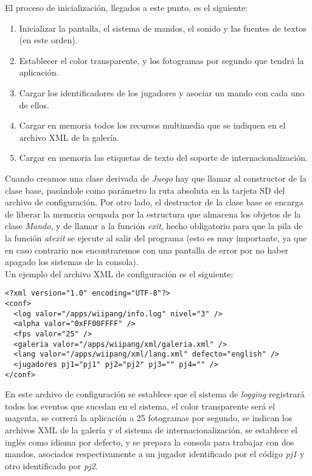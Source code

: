 El proceso de inicialización, llegados a este punto, es el siguiente:

\begin{enumerate}
\item Inicializar la pantalla, el sistema de mandos, el sonido y las fuentes de textos (en este orden).
\item Establecer el color transparente, y los fotogramas por segundo que tendrá la aplicación.
\item Cargar los identificadores de los jugadores y asociar un mando con cada uno de ellos.
\item Cargar en memoria todos los recursos multimedia que se indiquen en el archivo XML de la galería.
\item Cargar en memoria las etiquetas de texto del soporte de internacionalización.
\end{enumerate}

Cuando creamos una clase derivada de \emph{Juego} hay que llamar al constructor de la clase base, pasándole como parámetro la ruta absoluta en la tarjeta SD del archivo de configuración. Por otro lado, el destructor de la clase base se encarga de liberar la memoria ocupada por la estructura que almacena los objetos de la clase \emph{Mando}, y de llamar a la función \emph{exit}, hecho obligatorio para que la pila de la función \emph{atexit} se ejecute al salir del programa (esto es muy importante, ya que en caso contrario nos encontraremos con una pantalla de error por no haber apagado los sistemas de la consola).\\

Un ejemplo del archivo XML de configuración es el siguiente:

\begin{lstlisting}[style=XML]
<?xml version="1.0" encoding="UTF-8"?>
<conf>
  <log valor="/apps/wiipang/info.log" nivel="3" />
  <alpha valor="0xFF00FFFF" />
  <fps valor="25" />
  <galeria valor="/apps/wiipang/xml/galeria.xml" />
  <lang valor="/apps/wiipang/xml/lang.xml" defecto="english" />
  <jugadores pj1="pj1" pj2="pj2" pj3="" pj4="" />
</conf>
\end{lstlisting}

En este archivo de configuración se establece que el sistema de \emph{logging} registrará todos los eventos que sucedan en el sistema, el color transparente será el magenta, se correrá la aplicación a 25 fotogramas por segundo, se indican los archivos XML de la galería y el sistema de internacionalización, se establece el inglés como idioma por defecto, y se prepara la consola para trabajar con dos mandos, asociados respectivamente a un jugador identificado por el código \emph{pj1} y otro identificado por \emph{pj2}.

